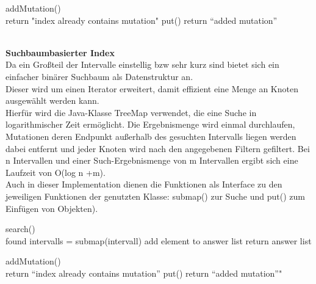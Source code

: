 \documentclass{scrartcl}
\begin{document}
\begin{algorithm}
addMutation()\\{
{return "index already contains mutation"\;}
put()\;
return \enquote{added mutation}\;
}
\end{algorithm}

\newpage
\hfill\\
\textbf{Suchbaumbasierter Index}\\
Da ein Großteil der Intervalle einstellig bzw sehr kurz sind bietet sich ein einfacher binärer Suchbaum als Datenstruktur an.\\
Dieser wird um einen Iterator erweitert, damit effizient eine Menge an Knoten ausgewählt werden kann.\\
Hierfür wird die Java-Klasse TreeMap verwendet, die eine Suche in logarithmischer Zeit ermöglicht. Die Ergebnismenge wird einmal durchlaufen, Mutationen deren Endpunkt außerhalb des gesuchten Intervalls liegen werden dabei entfernt und jeder Knoten wird nach den angegebenen Filtern gefiltert. Bei n Intervallen und einer Such-Ergebnismenge von m Intervallen ergibt sich eine Laufzeit von O(log n +m).\\
Auch in dieser Implementation dienen die Funktionen als Interface zu den jeweiligen Funktionen der genutzten Klasse: submap() zur Suche und put() zum Einfügen von Objekten).
\begin{algorithm}
search()\\{
found intervalls = submap(intervall)\;
{
{
{add element to answer list\;}
}
return answer list\;
}
}
\end{algorithm}


\begin{algorithm}
addMutation()\\{
{return \enquote{index already contains mutation}\;}
put()\;
return \enquote{added mutation}"\;
}
\end{algorithm}
\end{document}
